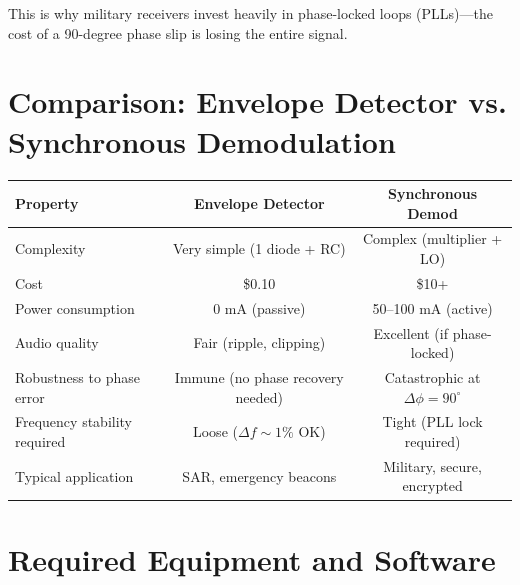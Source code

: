 \documentclass[11pt,letterpaper]{article}
\newcommand{\visualplaceholder}[1]{%
\begin{figure}[H]
    \centering
    \fbox{%
    \begin{minipage}{0.92\textwidth}
        \centering
        \vspace{0.6in}
        \textcolor{red}{\Large\textbf{[#1]}}\\
        \vspace{0.6in}
    \end{minipage}
    }
\end{figure}}
\begin{document}
\noindent
This is why military receivers invest heavily in phase-locked loops (PLLs)—the cost of a 90-degree phase slip is losing the entire signal.

\visualplaceholder{INSERT DIAGRAM: Phase Mismatch Effect (waveforms showing $\Delta\phi = 0^\circ$, $45^\circ$, $90^\circ$ with amplitude reduction)}

\section*{Comparison: Envelope Detector vs. Synchronous Demodulation}

\begin{center}
\begin{tabular}{|l|c|c|}
\hline
\textbf{Property} & \textbf{Envelope Detector} & \textbf{Synchronous Demod} \\
\hline
Complexity & Very simple (1 diode + RC) & Complex (multiplier + LO) \\
\hline
Cost & \$0.10 & \$10+ \\
\hline
Power consumption & 0 mA (passive) & 50--100 mA (active) \\
\hline
Audio quality & Fair (ripple, clipping) & Excellent (if phase-locked) \\
\hline
Robustness to phase error & Immune (no phase recovery needed) & Catastrophic at $\Delta\phi = 90^\circ$ \\
\hline
Frequency stability required & Loose ($\Delta f \sim 1\%$ OK) & Tight (PLL lock required) \\
\hline
Typical application & SAR, emergency beacons & Military, secure, encrypted \\
\hline
\end{tabular}
\end{center}

\clearpage

\section{Required Equipment and Software}
\end{document}
